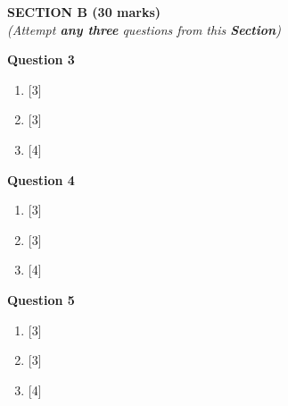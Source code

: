 \newpage
\begin{center}
   \large
   \textbf{SECTION B (30 marks)}\\
   \vspace{5mm}
   \normalsize
   \textit{(Attempt \textbf{any three} questions from this \textbf{Section})}
\end{center}
\par

\noindent
\textbf{Question 3}
\begin{enumerate}[label=(\roman*)]

    \item \hfill [3]

    \item \hfill [3]

    \item \hfill [4]

\end{enumerate}

\noindent
\textbf{Question 4}
\begin{enumerate}[label=(\roman*)]

    \item \hfill [3]

    \item \hfill [3]

    \item \hfill [4]

\end{enumerate}

\noindent
\textbf{Question 5}
\begin{enumerate}[label=(\roman*)]

    \item \hfill [3]

    \item \hfill [3]

    \item \hfill [4]

\end{enumerate}

